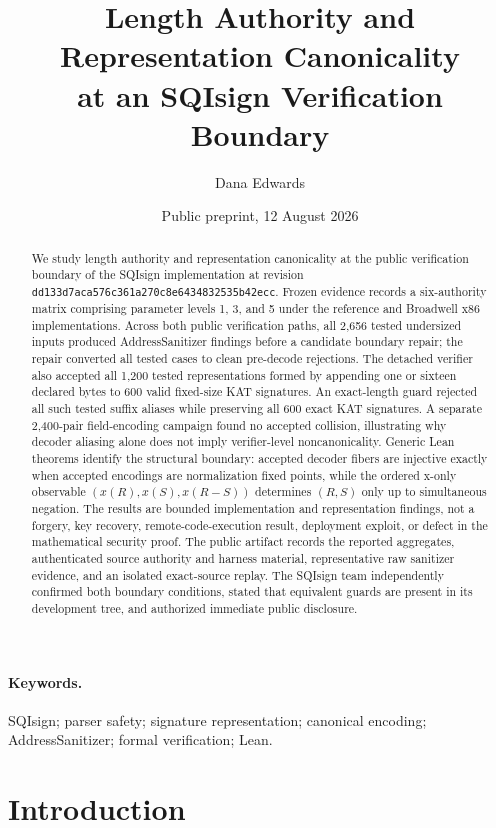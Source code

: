 \documentclass[11pt]{article}
\title{Length Authority and Representation Canonicality\\
at an SQIsign Verification Boundary}
\author{Dana Edwards}
\date{Public preprint, 12 August 2026}
\newcommand{\code}[1]{\texttt{#1}}
\begin{document}
\maketitle

\begin{abstract}
We study length authority and representation canonicality at the public
verification boundary of the SQIsign implementation at revision
\code{dd133d7aca576c361a270c8e6434832535b42ecc}.  Frozen evidence records a
six-authority matrix comprising parameter levels 1, 3, and 5 under the
reference and Broadwell x86 implementations.  Across both public verification
paths, all 2,656 tested undersized inputs produced AddressSanitizer findings
before a candidate boundary repair; the repair converted all tested cases to
clean pre-decode rejections.  The detached verifier also accepted all 1,200
tested representations formed by appending one or sixteen declared bytes to
600 valid fixed-size KAT signatures.  An exact-length guard rejected all such
tested suffix aliases while preserving all 600 exact KAT signatures.  A
separate 2,400-pair field-encoding campaign found no accepted collision,
illustrating why decoder aliasing alone does not imply verifier-level
noncanonicality.  Generic Lean theorems identify the structural boundary:
accepted decoder fibers are injective exactly when accepted encodings are
normalization fixed points, while the ordered x-only observable
$(x(R),x(S),x(R-S))$ determines $(R,S)$ only up to simultaneous negation.
The results are bounded implementation and representation findings, not a
forgery, key recovery, remote-code-execution result, deployment exploit, or
defect in the mathematical security proof.  The public artifact records the
reported aggregates, authenticated source authority and harness material,
representative raw sanitizer evidence, and an isolated exact-source replay.
The SQIsign team independently confirmed both boundary conditions, stated
that equivalent guards are present in its development tree, and authorized
immediate public disclosure.
\end{abstract}

\paragraph{Keywords.}
SQIsign; parser safety; signature representation; canonical encoding;
AddressSanitizer; formal verification; Lean.

\section{Introduction}
\end{document}
